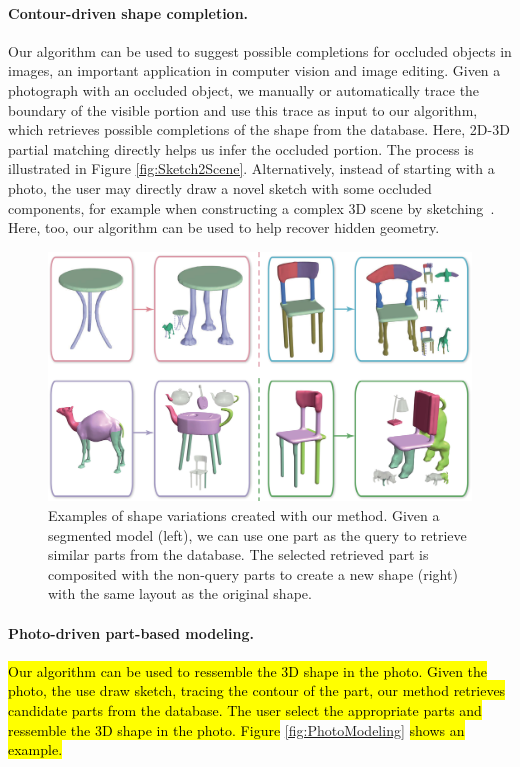 \paragraph*{Contour-driven shape completion.} Our algorithm can be used to suggest possible completions for occluded objects in images, an important application in computer vision and image editing. Given a photograph with an occluded object, we manually or automatically trace the boundary of the visible portion and use this trace as input to our algorithm, which retrieves possible completions of the shape from the database. Here, 2D-3D partial matching directly helps us infer the occluded portion. The process is illustrated in Figure \ref{fig:Sketch2Scene}. Alternatively, instead of starting with a photo, the user may directly draw a novel sketch with some occluded components, for example when constructing a complex 3D scene by sketching~\cite{KunXu2013}. Here, too, our algorithm can be used to help recover hidden geometry.

\begin{figure}\centering
\includegraphics[width=\linewidth]{./Material/ShapeVariation.pdf}
\caption{Examples of shape variations created with our method. Given a segmented model (left), we can use one part as the query to retrieve similar parts from the database. The selected retrieved part is composited with the non-query parts to create a new shape (right) with the same layout as the original shape.}\label{fig:SegedAsInput}
\end{figure}

\paragraph*{Photo-driven part-based modeling.} \hl{Our algorithm can be used to ressemble the 3D shape in the photo. Given the photo, the use draw sketch, tracing the contour of the part, our method retrieves candidate parts from the database. The user select the appropriate parts and ressemble the 3D shape in the photo. Figure } \ref{fig:PhotoModeling}\hl{ shows an example.}

